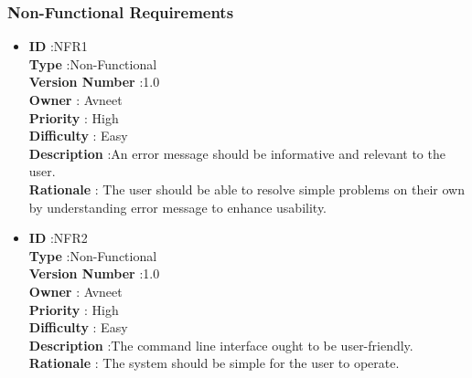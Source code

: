 \documentclass[a4paper,12pt]{report}
\begin{document}
\subsubsection{Non-Functional Requirements}
\begin{itemize}

	\item
    \textbf{ID } \hspace{3cm} :NFR1  \\
	\textbf{Type } \hspace{2.4cm}  :Non-Functional\\
	\textbf{Version Number} \hspace{0.3cm} :1.0  \\
	\textbf{Owner } \hspace{1.98cm} : Avneet \\
	\textbf{Priority } \hspace{1.75cm} : High\\
	\textbf{Difficulty } \hspace{1.5cm} : Easy\\
	\textbf{Description }\hspace{1.2cm} :An error message should be informative and relevant to the user.\\
	\textbf{Rationale }\hspace{1.6cm} : The user should be able to resolve simple problems on their own by understanding error message to enhance usability.\\

	\item
    \textbf{ID } \hspace{3cm} :NFR2  \\
	\textbf{Type } \hspace{2.4cm}  :Non-Functional\\
	\textbf{Version Number} \hspace{0.3cm} :1.0  \\
	\textbf{Owner } \hspace{1.98cm} : Avneet \\
	\textbf{Priority } \hspace{1.75cm} : High\\
	\textbf{Difficulty } \hspace{1.5cm} : Easy\\
	\textbf{Description }\hspace{1.2cm} :The command line interface ought to be user-friendly.\\
	\textbf{Rationale }\hspace{1.6cm} : The system should be simple for the user to operate. \\


\end{itemize}
\end{document}
